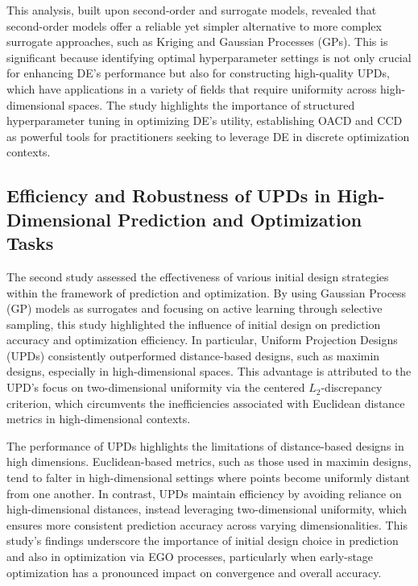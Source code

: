 This analysis, built upon second-order and surrogate models, revealed that second-order models offer a reliable yet simpler alternative to more complex surrogate approaches, such as Kriging and Gaussian Processes (GPs). This is significant because identifying optimal hyperparameter settings is not only crucial for enhancing DE's performance but also for constructing high-quality UPDs, which have applications in a variety of fields that require uniformity across high-dimensional spaces. The study highlights the importance of structured hyperparameter tuning in optimizing DE's utility, establishing OACD and CCD as powerful tools for practitioners seeking to leverage DE in discrete optimization contexts.

\subsection{Efficiency and Robustness of UPDs in High-Dimensional Prediction and Optimization Tasks}
The second study assessed the effectiveness of various initial design strategies within the framework of prediction and optimization. By using Gaussian Process (GP) models as surrogates and focusing on active learning through selective sampling, this study highlighted the influence of initial design on prediction accuracy and optimization efficiency. In particular, Uniform Projection Designs (UPDs) consistently outperformed distance-based designs, such as maximin designs, especially in high-dimensional spaces. This advantage is attributed to the UPD's focus on two-dimensional uniformity via the centered \(L_2\)-discrepancy criterion, which circumvents the inefficiencies associated with Euclidean distance metrics in high-dimensional contexts.

The performance of UPDs highlights the limitations of distance-based designs in high dimensions. Euclidean-based metrics, such as those used in maximin designs, tend to falter in high-dimensional settings where points become uniformly distant from one another. In contrast, UPDs maintain efficiency by avoiding reliance on high-dimensional distances, instead leveraging two-dimensional uniformity, which ensures more consistent prediction accuracy across varying dimensionalities. This study's findings underscore the importance of initial design choice in prediction and also in optimization via EGO processes, particularly when early-stage optimization has a pronounced impact on convergence and overall accuracy.

